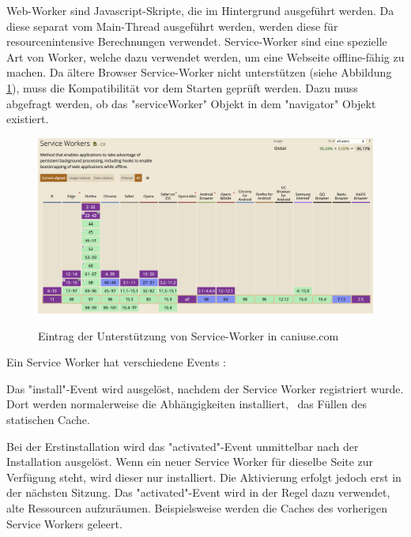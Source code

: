 

Web-Worker sind Javascript-Skripte, die im Hintergrund ausgeführt werden. 
Da diese separat vom Main-Thread ausgeführt werden, werden diese für resourcenintensive Berechnungen verwendet.
Service-Worker sind eine spezielle Art von Worker, welche dazu verwendet werden, um eine Webseite offline-fähig zu machen.
Da ältere Browser Service-Worker nicht unterstützen (siehe Abbildung \ref{fig:CanIUseServiceWorker}), muss die Kompatibilität vor dem Starten geprüft werden. 
Dazu muss abgefragt werden, ob das "serviceWorker" Objekt in dem "navigator" Objekt existiert. 

\begin{figure}[H]
    \centering
    \includegraphics[width=\textwidth]{media/ServiceWorker/CanIUseServiceWorker.png}
    \caption{Eintrag der Unterstützung von Service-Worker in caniuse.com}
    \cite{ciuServiceWorker}
    \label{fig:CanIUseServiceWorker}
\end{figure}

\clearpage


Ein Service Worker hat verschiedene Events \cite{MDNCacheAPI}: 


Das "{\ttfamily install}"-Event wird ausgelöst, nachdem der Service Worker registriert wurde. Dort werden normalerweise die Abhängigkeiten installiert, \zb\ das Füllen des statischen Cache.
    

Bei der Erstinstallation wird das "{\ttfamily activated}"-Event unmittelbar nach der Installation ausgelöst.
Wenn ein neuer Service Worker für dieselbe Seite zur Verfügung steht, wird dieser nur installiert.
Die Aktivierung erfolgt jedoch erst in der nächsten Sitzung.
Das "{\ttfamily activated}"-Event wird in der Regel dazu verwendet, alte Ressourcen aufzuräumen. 
Beispielsweise werden die Caches des vorherigen Service Workers geleert.


